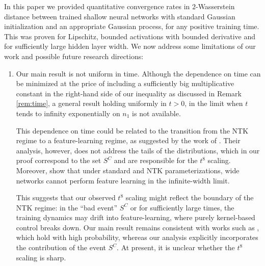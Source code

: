 \documentclass{article}
\theoremstyle{definition}
\theoremstyle{remark}
\numberwithin{equation}{section}
\begin{document}
In this paper we provided quantitative convergence rates in $2$-Wasserstein distance between trained shallow neural networks with standard Gaussian initialization and an appropriate Gaussian process, for any positive training time.
This was proven for Lipschitz, bounded activations with bounded derivative and for sufficiently large hidden layer width.
We now address some limitations of our work and possible future research directions:
\begin{enumerate}
    \item Our main result is not uniform in time.
        Although the dependence on time can be minimized at the price of including a sufficiently big multiplicative constant in the right-hand side of our inequality as discussed in Remark \ref{rem:time},
        a general result holding uniformly in $t>0$, in the limit when $t$ tends to infinity exponentially on $n_1$ is not available. 
        

        This dependence on time could be related to the transition from the NTK regime to a feature-learning regime, as suggested by the work of \cite{huang_yau}. 
        Their analysis, however, does not address the tails of the distributions, which in our proof correspond to the set $S^C$ and are responsible for the $t^8$ scaling.
        Moreover, \cite{yang4} show that under standard and NTK parameterizations, wide networks cannot perform feature learning in the infinite-width limit. 
        
        This suggests that our observed $t^8$ scaling might reflect the boundary of the NTK regime: 
        in the ``bad event'' $S^C$ or for sufficiently large times, the training dynamics may drift into feature-learning, where purely kernel-based control breaks down.
        Our main result remains consistent with works such as \cite{Bartlett_Montanari_Rakhlin_2021,bachchizat}, which hold with high probability, whereas our analysis explicitly incorporates the contribution of the event $S^C$.
        At present, it is unclear whether the $t^8$ scaling is sharp.
        

\end{enumerate}
\end{document}
